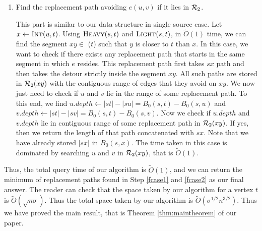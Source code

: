 \begin{enumerate}[leftmargin=*,noitemsep,nolistsep]
\item Find the replacement path avoiding $e(u,v)$ if it lies in $\mathcal{R}_2$.
\label{fcase2}

\noindent  This part is similar to our data-structure in single source case.
Let $x \leftarrow \textsc{Int}(u,t)$.  Using $\textsc{Heavy}(s,t)$ and $\textsc{Light}(s,t)$, in $\tilde O(1)$ time,
we can find the segment $xy \in $ \SBFS($t$) such that $y$ is closer to $t$ than $x$.
In this case, we want to check if there exists any
replacement path that starts in  the  same segment in which
$e$ resides. This  replacement path first takes $sx$ path and then takes
 the  detour strictly inside  the  segment $xy$. All such paths are stored in $\mathcal{R}_2(xy)$
with the contiguous range of edges that they avoid on $xy$.
We now just need to check if $u$ and $v$ lie in the range of some replacement path.
To this end, we find $u.depth \leftarrow |st| -|su| = B_0(s,t) - B_0(s,u)$
and $v.depth \leftarrow |st| -|sv| = B_0(s,t) - B_0(s,v)$.
Now we check if $u.depth$ and $v.depth$ lie in contiguous range of
some replacement path  in $\mathcal{R}_2(xy)$. If yes, then we return the length of that
path concatenated with $sx$.  Note that we have already stored $|sx|$ in $B_0(s,x)$.
The time taken in this case is dominated by searching $u$ and $v$ in $\mathcal{R}_2(xy)$,
that is $\tilde O(1)$.\iflong\\\else\vspace{1mm}\fi
\end{enumerate}

\noindent Thus, the total query time of our algorithm is $\tilde O(1)$, and we can return the
minimum of replacement paths found in Step \ref{fcase1} and \ref{fcase2} as our final answer.
The reader can check that the space taken by our algorithm for a
vertex $t$ is $\tilde O(\sqrt{n\sigma})$. Thus the total space taken by our algorithm is
$\tilde O( \sigma^{1/2} n^{3/2}) $. Thus we have proved the main result, that is Theorem \ref{thm:maintheorem} of our paper.

